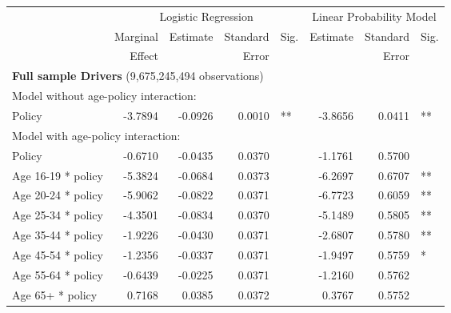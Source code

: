 
\begin{table}%
\centering 
\begin{tabular}{l r r r l r r l} 

\hline 
 
 & \multicolumn{4}{c}{Logistic Regression}  & \multicolumn{3}{c}{Linear Probability Model} \\ 

 \cmidrule(lr){2-5}\cmidrule(lr){6-8} 
 & Marginal & Estimate & Standard & Sig. & Estimate & Standard & Sig. \\ 
 &   Effect &          &  Error   &      &          &  Error   &     \\ 

\hline 
 
\multicolumn{7}{l}{\textbf{Full sample Drivers} (9,675,245,494 observations)} \\ 

\hline
\multicolumn{7}{l}{Model without age-policy interaction: } \\ 
Policy                   &  -3.7894       &  -0.0926        &  0.0010       &   **       &  -3.8656        &  0.0411       &   **       \\ 
\hline
\multicolumn{7}{l}{Model with age-policy interaction: } \\ 
Policy                   &  -0.6710       &  -0.0435        &  0.0370       &            &  -1.1761        &  0.5700       &            \\ 
Age 16-19 * policy   &  -5.3824       &  -0.0684        &  0.0373       &            &  -6.2697        &  0.6707       &   **       \\ 
Age 20-24 * policy   &  -5.9062       &  -0.0822        &  0.0371       &            &  -6.7723        &  0.6059       &   **       \\ 
Age 25-34 * policy   &  -4.3501       &  -0.0834        &  0.0370       &            &  -5.1489        &  0.5805       &   **       \\ 
Age 35-44 * policy   &  -1.9226       &  -0.0430        &  0.0371       &            &  -2.6807        &  0.5780       &   **       \\ 
Age 45-54 * policy   &  -1.2356       &  -0.0337        &  0.0371       &            &  -1.9497        &  0.5759       &    *       \\ 
Age 55-64 * policy   &  -0.6439       &  -0.0225        &  0.0371       &            &  -1.2160        &  0.5762       &            \\ 
Age 65+ * policy   &  0.7168       &  0.0385        &  0.0372       &            &  0.3767        &  0.5752       &            \\ 


\end{tabular}
\end{table}
